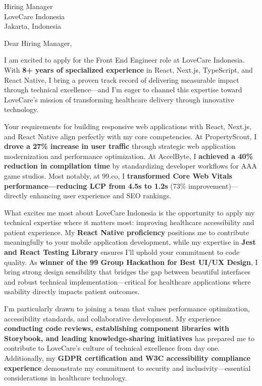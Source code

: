 \documentclass[11pt,a4paper]{letter}
\begin{document}
\begin{letter}{%
    Hiring Manager \\
    LoveCare Indonesia \\
    Jakarta, Indonesia
}

\opening{Dear Hiring Manager,}

I am excited to apply for the Front End Engineer role at LoveCare Indonesia. With \textbf{8+ years of specialized experience} in React, Next.js, TypeScript, and React Native, I bring a proven track record of delivering measurable impact through technical excellence---and I'm eager to channel this expertise toward LoveCare's mission of transforming healthcare delivery through innovative technology.

\vspace{10pt}

Your requirements for building responsive web applications with React, Next.js, and React Native align perfectly with my core competencies. At PropertyScout, I \textbf{drove a 27\% increase in user traffic} through strategic web application modernization and performance optimization. At AccelByte, I \textbf{achieved a 40\% reduction in compilation time} by standardizing developer workflows for AAA game studios. Most notably, at 99.co, I \textbf{transformed Core Web Vitals performance---reducing LCP from 4.5s to 1.2s} (73\% improvement)---directly enhancing user experience and SEO rankings.

\vspace{10pt}

What excites me most about LoveCare Indonesia is the opportunity to apply my technical expertise where it matters most: improving healthcare accessibility and patient experience. My \textbf{React Native proficiency} positions me to contribute meaningfully to your mobile application development, while my expertise in \textbf{Jest and React Testing Library} ensures I'll uphold your commitment to code quality. As \textbf{winner of the 99 Group Hackathon for Best UI/UX Design}, I bring strong design sensibility that bridges the gap between beautiful interfaces and robust technical implementation---critical for healthcare applications where usability directly impacts patient outcomes.

\vspace{10pt}

I'm particularly drawn to joining a team that values performance optimization, accessibility standards, and collaborative development. My experience \textbf{conducting code reviews, establishing component libraries with Storybook, and leading knowledge-sharing initiatives} has prepared me to contribute to LoveCare's culture of technical excellence from day one. Additionally, my \textbf{GDPR certification and W3C accessibility compliance experience} demonstrate my commitment to security and inclusivity---essential considerations in healthcare technology.


\end{letter}
\end{document}
